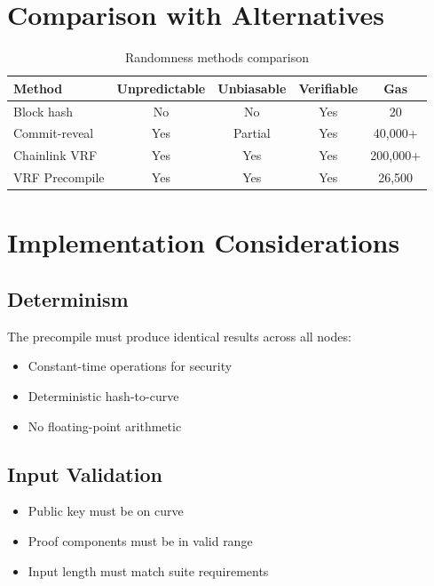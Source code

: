 \documentclass[11pt,a4paper]{article}
\theoremstyle{definition}
\begin{document}
\section{Comparison with Alternatives}

\begin{table}[h]
\centering
\begin{tabular}{lcccc}
\toprule
\textbf{Method} & \textbf{Unpredictable} & \textbf{Unbiasable} & \textbf{Verifiable} & \textbf{Gas} \\
\midrule
Block hash & No & No & Yes & 20 \\
Commit-reveal & Yes & Partial & Yes & 40,000+ \\
Chainlink VRF & Yes & Yes & Yes & 200,000+ \\
VRF Precompile & Yes & Yes & Yes & 26,500 \\
\bottomrule
\end{tabular}
\caption{Randomness methods comparison}
\label{tab:compare}
\end{table}

\section{Implementation Considerations}

\subsection{Determinism}

The precompile must produce identical results across all nodes:
\begin{itemize}
    \item Constant-time operations for security
    \item Deterministic hash-to-curve
    \item No floating-point arithmetic
\end{itemize}

\subsection{Input Validation}

\begin{itemize}
    \item Public key must be on curve
    \item Proof components must be in valid range
    \item Input length must match suite requirements
\end{itemize}
\end{document}
